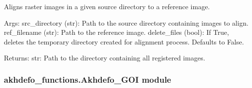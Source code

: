 \documentclass[letterpaper,10pt,english]{sphinxmanual}
\begin{document}
\begin{fulllineitems}
\label{\detokenize{akhdefo_functions:akhdefo_functions.Akhdefo_Coreg.raster_alignment}}
\pysigstartsignatures
{}
\pysigstopsignatures
\sphinxAtStartPar
Aligns raster images in a given source directory to a reference image.

\sphinxAtStartPar
Args:
src\_directory (str): Path to the source directory containing images to align.
ref\_filename (str): Path to the reference image.
delete\_files (bool): If True, deletes the temporary directory created for alignment process. Defaults to False.

\sphinxAtStartPar
Returns:
str: Path to the directory containing all registered images.

\end{fulllineitems}



\subsubsection{akhdefo\_functions.Akhdefo\_GOI module}
\label{\detokenize{akhdefo_functions:module-akhdefo_functions.Akhdefo_GOI}}\label{\detokenize{akhdefo_functions:akhdefo-functions-akhdefo-goi-module}}
\end{document}

